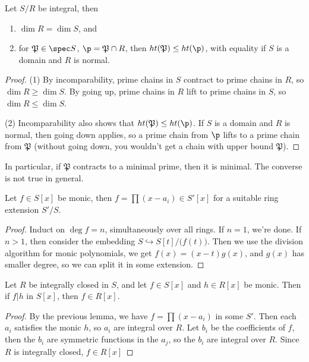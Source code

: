  \begin{theorem}
   Let $S/R$ be integral, then
   \begin{enumerate}
     \item $\dim R = \dim S$, and
     \item for $\mathfrak{P}\in \spec S$, $\p=\mathfrak{P}\cap R$, then
     $ht(\mathfrak{P})\le ht(\p)$, with equality if $S$ is a domain and $R$ is normal.
   \end{enumerate}
 \end{theorem}
 \begin{proof}
   (1) By incomparability, prime chains in $S$ contract to prime chains in $R$, so $\dim
   R\ge \dim S$. By going up, prime chains in $R$ lift to prime chains in $S$, so $\dim
   R\le \dim S$.

   (2) Incomparability also shows that $ht(\mathfrak{P})\le ht(\p)$. If $S$ is a domain
   and $R$ is normal, then going down applies, so a prime chain from $\p$ lifts to a
   prime chain from $\mathfrak{P}$ (without going down, you wouldn't get a chain with
   upper bound $\mathfrak{P}$).
 \end{proof}
 In particular, if $\mathfrak{P}$ contracts to a minimal prime, then it is minimal. The
 converse is not true in general.

 \begin{lemma}
   Let $f\in S[x]$ be monic, then $f=\prod (x-a_i)\in S'[x]$ for a suitable ring
   extension $S'/S$.
 \end{lemma}
 \begin{proof}
   Induct on $\deg f=n$, simultaneously over all rings. If $n=1$, we're done. If $n>1$,
   then consider the embedding $S\hookrightarrow S[t]/\bigl(f(t)\bigr)$. Then we use the
   division algorithm for monic polynomials, we get $f(x)=(x-t)g(x)$, and $g(x)$ has
   smaller degree, so we can split it in some extension.
 \end{proof}
 \begin{lemma}
   Let $R$ be integrally closed in $S$, and let $f\in S[x]$ and $h\in R[x]$ be monic.
   Then if $f|h$ in $S[x]$, then $f\in R[x]$.
 \end{lemma}
 \begin{proof}
   By the previous lemma, we have $f=\prod (x-a_i)$ in some $S'$. Then each $a_i$
   satisfies the monic $h$, so $a_i$ are integral over $R$. Let $b_i$ be the coefficients
   of $f$, then the $b_i$ are symmetric functions in the $a_j$, so the $b_i$ are integral
   over $R$. Since $R$ is integrally closed, $f\in R[x]$
 \end{proof}
 \setcounter{lecture}{26}

